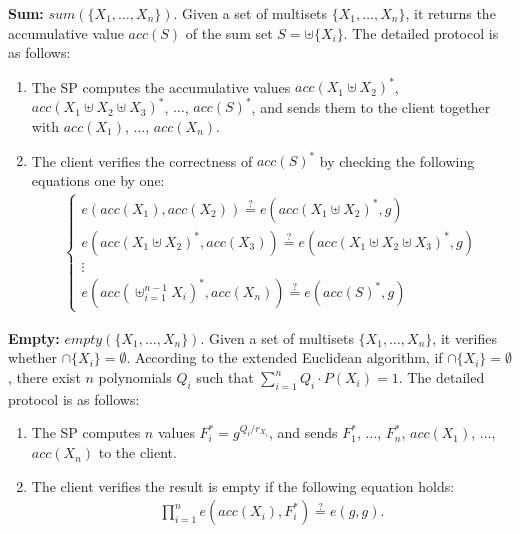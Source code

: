 \textbf{Sum:} $sum(\{X_1, \dots, X_n\})$.
Given a set of multisets $\{X_1, \dots, X_n\}$, it returns the accumulative value $acc(S)$ of the sum set $S = \uplus \{X_i\}$. The detailed protocol is as follows:
\begin{enumerate}
  \item The SP computes the accumulative values ${acc(X_1 \uplus X_2)}^*$, ${acc(X_1 \uplus X_2 \uplus X_3)}^*$, $\dots$, ${acc(S)}^*$, and sends them to the client together with $acc(X_1)$, $\dots$, $acc(X_n)$.
  \item The client verifies the correctness of ${acc(S)}^*$ by checking the following equations one by one:
    \begin{align*}
      \left \{
        \begin{array}{l}
          e(acc(X_1), acc(X_2)) \stackrel{?}{=} e({acc(X_1 \uplus X_2)}^*, g)\\
          e({acc(X_1\uplus X_2)}^*, acc(X_3)) \stackrel{?}{=} e({acc(X_1\uplus X_2\uplus X_3)}^*, g) \\
          \vdots\\
          e({acc(\uplus_{i=1}^{n-1} X_i)}^*, acc(X_n)) \stackrel{?}{=} e({acc(S)}^*, g)
        \end{array}
      \right.
    \end{align*}
\end{enumerate}

\textbf{Empty:} $empty(\{X_1, \dots, X_n\})$.
Given a set of multisets $\{X_1, \dots, X_n\}$, it verifies whether $\cap \{X_i\} = \emptyset$. According to the extended Euclidean algorithm, if $\cap \{X_i\} = \emptyset$, there exist $n$ polynomials $Q_i$ such that $\sum_{i=1}^n Q_i \cdot P(X_i) = 1$. The detailed protocol is as follows:
\begin{enumerate}
  \item The SP computes $n$ values $F_i^* = g^{{Q_i}/{r_{X_i}}}$, and sends $F_1^*$, $\dots$, $F_n^*$, $acc(X_1)$, $\dots$, $acc(X_n)$ to the client.
  \item The client verifies the result is empty if the following equation holds:
    \begin{align*}
      \prod_{i=1}^n e(acc(X_i), F_i^*) \stackrel{?}{=} e(g, g).
    \end{align*}
\end{enumerate}

